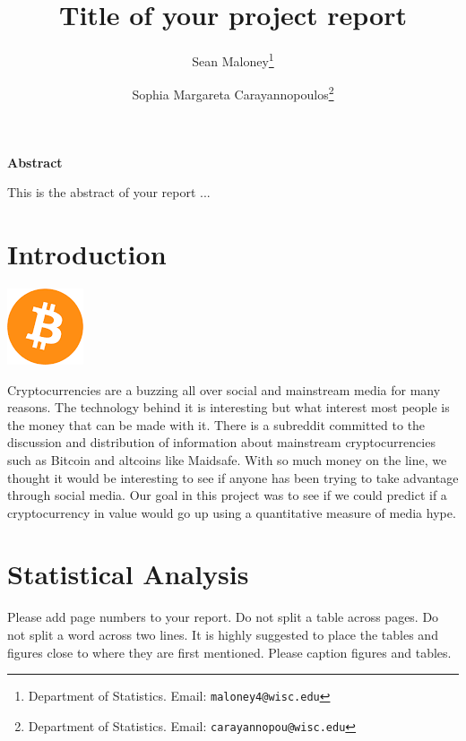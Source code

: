 \documentclass[12pt]{article}
\begin{document}
\title{Title of your project report}  

\author{
Sean Maloney\thanks{Department of Statistics.  Email: {\tt maloney4@wisc.edu}}  %
\and 
Sophia Margareta Carayannopoulos\thanks{Department of Statistics.  Email: {\tt  carayannopou@wisc.edu}}  %
}

\maketitle

\begin{center}
\textbf{Abstract}
\end{center}

This is the abstract of your report ... 


\thispagestyle{empty}

\newpage


\section{Introduction}\label{intro}
\includegraphics{images/unnamed.png}

Cryptocurrencies are a buzzing all over social and mainstream media for many reasons. The technology behind it is interesting but what interest most people is the money that can be made with it. There is a subreddit committed to the discussion and distribution of information about mainstream cryptocurrencies such as Bitcoin and altcoins like Maidsafe. With so much money on the line, we thought it would be interesting to see if anyone has been trying to take advantage through social media. Our goal in this project was to see if we could predict if a cryptocurrency in value would go up using a quantitative measure of media hype.


\section{Statistical Analysis}\label{datagather}

Please add page numbers to your report. Do not split a table across pages. Do not split a word across two lines. It is highly suggested to place the tables and figures close to where they are first mentioned. Please caption figures and tables.
\end{document}
